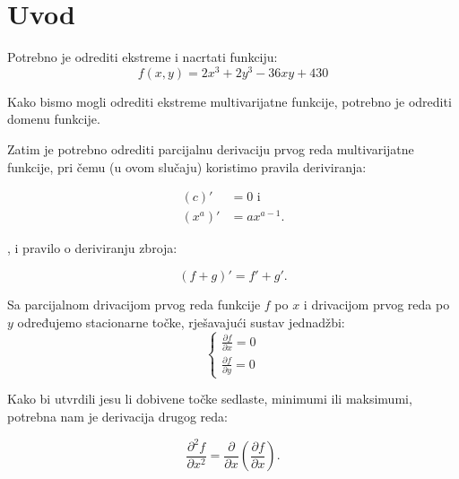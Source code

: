 \documentclass[12pt,a4paper]{report}
\begin{document}





% 

\tableofcontents
\newpage

\setcounter{page}{1}

\chapter{Uvod}

Potrebno je odrediti ekstreme i nacrtati funkciju:
\begin{equation}
f(x, y) = 2x^3 + 2y^3 - 36xy + 430
\end{equation}

Kako bismo mogli odrediti ekstreme multivarijatne funkcije, potrebno je odrediti domenu funkcije.

Zatim je potrebno odrediti parcijalnu derivaciju prvog reda multivarijatne funkcije,
pri čemu (u ovom slučaju) koristimo pravila deriviranja:

\begin{align}
    (c)' &= 0 \text{ i }\\
    (x^a)' &= ax^{a-1}.
\end{align}

, i pravilo o deriviranju zbroja:

\begin{equation}
    (f + g)' = f' + g'.
\end{equation}

Sa parcijalnom drivacijom prvog reda funkcije $f$ po $x$ i drivacijom prvog reda po $y$ određujemo stacionarne točke, rješavajući sustav jednadžbi:
\begin{equation}
    \begin{cases}
        \frac{\partial f}{\partial x} = 0 \\
        \frac{\partial f}{\partial y} = 0
    \end{cases}
\end{equation}

Kako bi utvrdili jesu li dobivene točke sedlaste, minimumi ili maksimumi, potrebna nam je derivacija drugog reda:

\begin{equation}
    \frac{\partial^2 f}{\partial x^2} = \frac{\partial}{\partial x} (\frac{\partial f}{\partial x}).
\end{equation}
\end{document}
